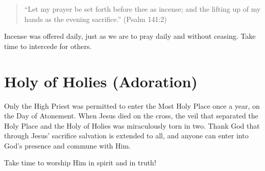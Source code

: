 \begin{quote}
``Let my prayer be set forth before thee as incense;
    and the lifting up of my hands as the evening sacrifice.'' (Psalm 141:2)
\end{quote}

Incense was offered daily, just as we are to pray daily and without ceasing.
Take time to intercede for others.


\section{Holy of Holies (Adoration)}

Only the High Priest was permitted to enter the Most Holy Place
once a year, on the Day of Atonement.
When Jesus died on the cross, the veil that separated the Holy Place
and the Holy of Holies was miraculously torn in two.
Thank God that through Jesus' sacrifice salvation is extended to all,
and anyone can enter into God’s presence and commune with Him.

Take time to worship Him in spirit and in truth!
